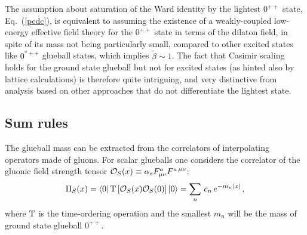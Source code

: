 \documentclass[prl,aps,
showpacs,
preprint,
nofootinbib,
floatfix,
superscriptaddress, showkeys
]{revtex4-1}
\begin{document}
The assumption about saturation of the Ward identity by the lightest $0^{++}$ state, Eq.~(\ref{pcdc}),
is equivalent to assuming  the existence of a weakly-coupled low-energy effective field theory for 
the $0^{++}$ state in terms of the dilaton field, in spite of its mass not being particularly small, compared to other excited states like $0^{\ast++}$ glueball states, which implies $\tilde\beta\sim1$. The fact that 
Casimir scaling holds for the ground state glueball but not for excited states (as hinted also by lattice calculations) is therefore quite intriguing, and very distinctive from analysis based on other approaches that do not differentiate the lightest state. 


\subsection{Sum rules}
The glueball mass can be extracted from the correlators of  interpolating operators made of gluons. 
For scalar glueballs one considers the correlator of the gluonic field strength tensor
${\cal O}_S(x)\equiv \alpha_sF_{\mu\nu}^aF^{a\,\mu\nu}$: 
\begin{equation}
\Pi_{S}(x)=\left<0\right|{\rm T}\left[{\cal O}_S(x){\cal O}_S(0)\right]\left|0\right>=\sum_n\,c_n\,e^{-m_n\left|x\right|}\,,
\label{cor}
\end{equation} 
where ${\rm T}$ is the time-ordering operation and the smallest $m_n$ will be the mass of ground state glueball $0^{++}$.
 
\end{document}
